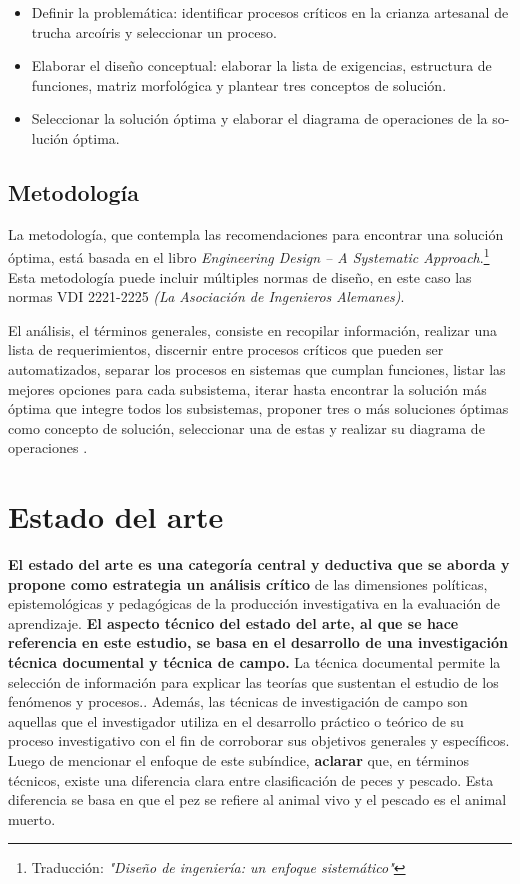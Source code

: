 \begin{itemize}
\item Definir la problemática: identificar procesos críticos en la crianza artesanal de trucha arcoíris y seleccionar un proceso.
\item Elaborar el diseño conceptual: elaborar la lista de exigencias, estructura de funciones, matriz morfológica y plantear tres conceptos de solución.
\item Seleccionar la solución óptima y elaborar el diagrama de operaciones de la so-lución óptima. 
\end{itemize}

\subsection{Metodología}

La metodología, que contempla las recomendaciones para encontrar una solución óptima, está basada en el libro \textit{Engineering Design – A Systematic Approach}.\footnote{Traducción: \textit{"Diseño de ingeniería: un enfoque sistemático"}}  Esta metodología puede incluir múltiples normas de diseño, en este caso las normas VDI 2221-2225 \textit{(La Asociación de Ingenieros Alemanes)}.

El análisis, el términos generales, consiste en recopilar información, realizar una lista de requerimientos, discernir entre procesos críticos que pueden ser automatizados, separar los procesos en sistemas que cumplan funciones, listar las mejores opciones para cada subsistema, iterar hasta encontrar la solución más óptima que integre todos los subsistemas, proponer tres o más soluciones óptimas como concepto de solución, seleccionar una de estas y realizar su diagrama de operaciones .

\section{Estado del arte}
\textbf{El estado del arte es una categoría central y deductiva que se aborda y propone como estrategia un análisis crítico} de las dimensiones políticas, epistemológicas y pedagógicas de la producción investigativa en la evaluación de aprendizaje.\cite{GuevaraPatino2016} \textbf{El aspecto técnico del estado del arte, al que se hace referencia en este estudio, se basa en el desarrollo de una investigación técnica documental y técnica de campo.} La técnica documental permite la selección de información para explicar las teorías que sustentan el estudio de los fenómenos y procesos.. \cite{Martinez2003} Además, las técnicas de investigación de campo son aquellas que el investigador utiliza en el desarrollo práctico o teórico de su proceso investigativo con el fin de corroborar sus objetivos generales y específicos. \cite{GuevaraPatino2016}\\
Luego de mencionar el enfoque de este subíndice, \textbf{aclarar} que, en términos técnicos, existe una diferencia clara entre clasificación de peces y pescado. Esta diferencia se basa en que el pez se refiere al animal vivo y el pescado es el animal muerto.\\

